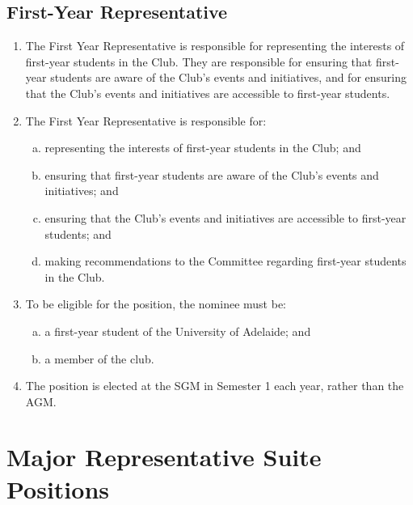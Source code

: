 \documentclass{schedule}
\begin{document}
\subsection{First-Year Representative}
\begin{enumerate}[(1)]
    \item The First Year Representative is responsible for representing the interests of first-year students in the Club. They are responsible for ensuring that first-year students are aware of the Club's events and initiatives, and for ensuring that the Club's events and initiatives are accessible to first-year students.
    \item The First Year Representative is responsible for:
          \begin{enumerate}[(a)]
              \item representing the interests of first-year students in the Club; and
              \item ensuring that first-year students are aware of the Club's events and initiatives; and
              \item ensuring that the Club's events and initiatives are accessible to first-year students; and
              \item making recommendations to the Committee regarding first-year students in the Club.
          \end{enumerate}
    \item To be eligible for the position, the nominee must be:
          \begin{enumerate}[(a)]
              \item a first-year student of the University of Adelaide; and
              \item a member of the club.
          \end{enumerate}
    \item The position is elected at the SGM in Semester 1 each year, rather than the AGM.
\end{enumerate}


\section{Major Representative Suite Positions}
\end{document}
